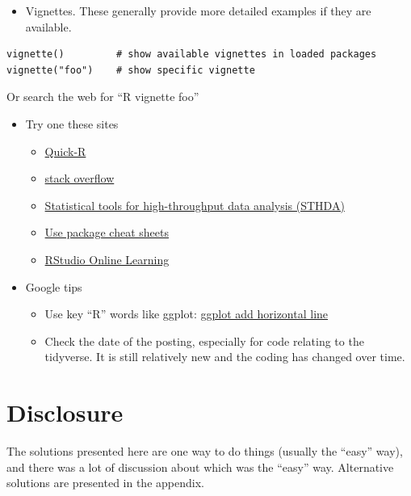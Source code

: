 \documentclass[
]{book}
\providecommand{\tightlist}{%
  \setlength{\itemsep}{0pt}\setlength{\parskip}{0pt}}
\begin{document}
\begin{itemize}
\tightlist
\item
  Vignettes. These generally provide more detailed examples if they are available.
\end{itemize}

\begin{verbatim}
vignette()         # show available vignettes in loaded packages
vignette("foo")    # show specific vignette
\end{verbatim}

Or search the web for ``R vignette foo''

\begin{itemize}
\tightlist
\item
  Try one these sites

  \begin{itemize}
  \tightlist
  \item
    \href{https://www.statmethods.net/index.html}{Quick-R}
  \item
    \href{https://stackoverflow.com/}{stack overflow}
  \item
    \href{http://www.sthda.com/english/}{Statistical tools for high-throughput data analysis (STHDA)}
  \item
    \href{https://www.rstudio.com/resources/cheatsheets/}{Use package cheat sheets}
  \item
    \href{https://www.rstudio.com/online-learning/}{RStudio Online Learning}
  \end{itemize}
\item
  Google tips

  \begin{itemize}
  \tightlist
  \item
    Use key ``R'' words like ggplot: \href{https://www.google.com/search?q=ggplot+add+horizontal+line}{ggplot add horizontal line}
  \item
    Check the date of the posting, especially for code relating to the tidyverse. It is still relatively new and the coding has changed over time.
  \end{itemize}
\end{itemize}

\hypertarget{disclosure}{%
\section{Disclosure}\label{disclosure}}

The solutions presented here are one way to do things (usually the ``easy'' way), and there was a lot of discussion about which was the ``easy'' way. Alternative solutions are presented in the appendix.
\end{document}

